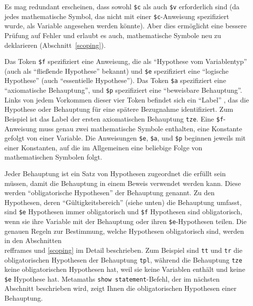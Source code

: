 Es mag redundant erscheinen, dass sowohl \texttt{\$c} als auch \texttt{\$v} erforderlich sind (da jedes mathematische Symbol, das nicht mit einer \texttt{\$c}-Anweisung spezifiziert wurde, als Variable angesehen werden könnte). Aber dies ermöglicht eine bessere Prüfung auf Fehler und erlaubt es auch, mathematische Symbole neu zu  deklarieren (Abschnitt~\ref{scoping}).

Das Token \texttt{\$f} spezifiziert eine Anweisung, die als "`Hypothese vom Variablentyp"' (auch als "`fließende Hypothese"' bekannt) und \texttt{\$e} spezifiziert eine "`logische Hypothese"' (auch "`essentielle Hypothese"').
Das Token \texttt{\$a} spezifiziert eine "`axiomatische
Behauptung"', und \texttt{\$p} spezifiziert eine "`beweisbare Behauptung"'. Links von jedem Vorkommen dieser vier Token befindet sich ein "`Label"' , das die Hypothese oder Behauptung für eine spätere Bezugnahme identifiziert.  Zum Beispiel ist das Label der ersten axiomatischen Behauptung \texttt{tze}.  Eine \texttt{\$f}-Anweisung muss genau zwei mathematische Symbole enthalten, eine Konstante gefolgt von einer Variable.  Die Anweisungen \texttt{\$e}, \texttt{\$a}, und \texttt{\$p} beginnen jeweils mit einer Konstanten, auf die im Allgemeinen eine beliebige Folge von mathematischen Symbolen folgt.

Jeder Behauptung ist ein Satz von Hypothesen zugeordnet die erfüllt sein müssen, damit die Behauptung in einem Beweis verwendet werden kann.
Diese werden "`obligatorische Hypothesen"'  der Behauptung genannt.  Zu den Hypothesen, deren "`Gültigkeitsbereich"' (siehe unten) die Behauptung umfasst, sind \texttt{\$e} Hypothesen immer obligatorisch und \texttt{\$f} Hypothesen sind obligatorisch, wenn sie ihre Variable mit der Behauptung oder ihren \texttt{\$e}-Hypothesen teilen.  Die genauen Regeln zur Bestimmung, welche Hypothesen obligatorisch sind, werden in den Abschnitten~\\ref{frames} und \ref{scoping} im Detail beschrieben.  Zum Beispiel sind \texttt{tt} und \texttt{tr} die obligatorischen Hypothesen der Behauptung \texttt{tpl}, während die Behauptung \texttt{tze} keine obligatorischen Hypothesen hat, weil sie keine Variablen enthält und keine \texttt{\$e} Hypothese hat.  Metamaths \texttt{show statement}-Befehl, der im nächsten Abschnitt beschrieben wird, zeigt Ihnen die obligatorischen Hypothesen einer Behauptung.

